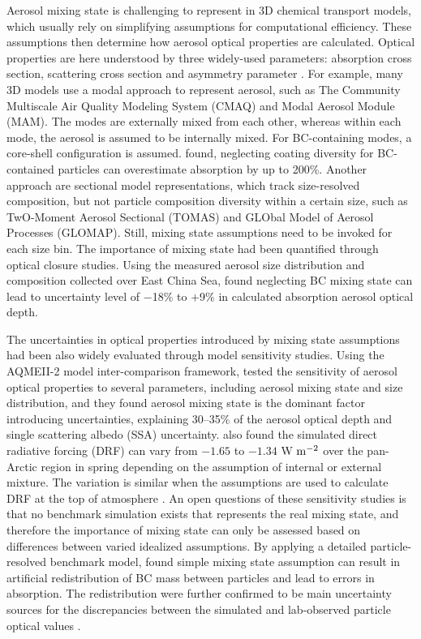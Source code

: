 \documentclass[edeposit,fullpage]{uiucthesis2009}
\begin{document}
Aerosol mixing state is challenging to represent in 3D chemical
transport models, which usually rely on simplifying assumptions for
computational efficiency. These assumptions then determine how aerosol
optical properties are calculated. Optical properties are here
understood by three widely-used parameters: absorption cross section,
scattering cross section and asymmetry parameter \citep{Majdi2020}.
For example, many 3D models use a modal approach to represent aerosol,
such as The Community Multiscale Air Quality Modeling System (CMAQ)
and Modal Aerosol Module (MAM)\citep{Binkowski2007, Appel2017,Liu2012}.
The modes are externally mixed from each other, whereas
within each mode, the aerosol is assumed to be internally mixed. For
BC-containing modes, a core-shell configuration is assumed. \citet{Fierce2016} found,
neglecting coating diversity for BC-contained particles can overestimate absorption by up to 
200\%. Another approach are sectional model representations, which track
size-resolved composition, but not particle composition diversity
within a certain size, such as TwO-Moment Aerosol Sectional (TOMAS) and
GLObal Model of Aerosol Processes (GLOMAP)\citep{kodros2018size, spracklen2005global}. 
Still, mixing state assumptions need to be invoked for each
size bin. The importance of mixing state had been quantified through optical closure studies. 
Using the measured aerosol size distribution and composition collected over East China Sea, \citet{koike2014case}
found neglecting BC mixing state can lead to uncertainty level of $-$18\% to $+$9\% in calculated absorption aerosol optical depth. 

The uncertainties in optical properties introduced by mixing state
assumptions had been also widely evaluated through model sensitivity studies.
Using the AQMEII-2 model inter-comparison framework, \citet{Curci2015} tested
the sensitivity of aerosol optical properties to several parameters,
including aerosol mixing state and size distribution, and they found
aerosol mixing state is the dominant factor introducing uncertainties,
explaining 30--35\% of the aerosol optical depth and single scattering
albedo (SSA) uncertainty. \citet{kodros2018size} also found the
simulated direct radiative forcing (DRF) can vary from $-1.65$ to
$-1.34$ W $\rm m^{-2}$ over the pan-Arctic region in spring depending
on the assumption of internal or external mixture. The variation is
similar when the assumptions are used to calculate DRF at the top of
atmosphere \citep{ma2012aerosol}. An open questions of these
sensitivity studies is that no benchmark simulation exists that
represents the real mixing state, and therefore the importance of
mixing state can only be assessed based on differences between varied
idealized assumptions. By applying a detailed particle-resolved benchmark
model, \citet{Fierce2017} found simple mixing state assumption can result in 
artificial redistribution of BC mass between particles and lead to errors in 
absorption. The redistribution were further confirmed to be main uncertainty sources 
for the discrepancies between the simulated and lab-observed particle optical values \citep{Fierce2020}.
\end{document}
